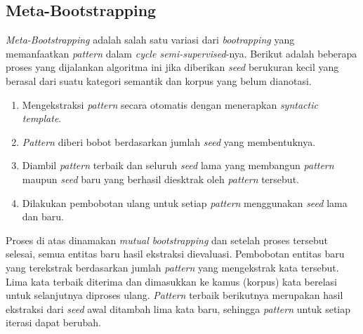 \subsection{Meta-Bootstrapping}
\textit{Meta-Bootstrapping} adalah salah satu variasi dari \textit{bootrapping} yang memanfaatkan \textit{pattern} dalam \textit{cycle semi-supervised}-nya. Berikut adalah beberapa proses \citep{riloff1999learning} yang dijalankan algoritma ini jika diberikan \textit{seed} berukuran kecil yang berasal dari suatu kategori semantik dan korpus yang belum dianotasi.
\begin{enumerate}
  \item Mengekstraksi \textit{pattern} secara otomatis dengan menerapkan \textit{syntactic template}.
  \item \textit{Pattern} diberi bobot berdasarkan jumlah \textit{seed} yang membentuknya.
  \item Diambil \textit{pattern} terbaik dan seluruh \textit{seed} lama yang membangun \textit{pattern} maupun \textit{seed} baru yang berhasil diesktrak oleh \textit{pattern} tersebut.
  \item Dilakukan pembobotan ulang untuk setiap \textit{pattern} menggunakan \textit{seed} lama dan baru.
\end{enumerate}

Proses di atas dinamakan \textit{mutual bootstrapping} dan setelah proses tersebut selesai, semua entitas baru hasil ekstraksi dievaluasi. Pembobotan entitas baru yang terekstrak berdasarkan jumlah \textit{pattern} yang mengekstrak kata tersebut. Lima kata terbaik diterima dan dimasukkan ke kamus (korpus) kata berelasi untuk selanjutnya diproses ulang. \textit{Pattern} terbaik berikutnya merupakan hasil ekstraksi dari \textit{seed} awal ditambah lima kata baru, sehingga \textit{pattern} untuk setiap iterasi dapat berubah. 

